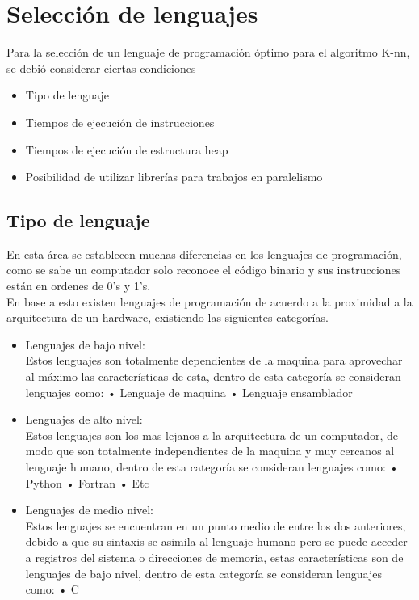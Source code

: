 \section{Selección de lenguajes}

Para la selección de un lenguaje de programación óptimo para el algoritmo K-nn, se debió considerar ciertas condiciones
\\
\begin{itemize}
\item Tipo de lenguaje
\item Tiempos de ejecución de instrucciones
\item Tiempos de ejecución de estructura heap
\item Posibilidad de utilizar librerías para trabajos en paralelismo
\end{itemize}  

\subsection*{Tipo de lenguaje}
En esta área se establecen muchas diferencias en los lenguajes de programación, como se sabe un computador solo reconoce el código binario y sus instrucciones están en ordenes de 0's y 1's. \\
En base a esto existen lenguajes de programación de acuerdo a la proximidad a la arquitectura de un hardware, existiendo las siguientes categorías.

\begin{itemize}
	\item Lenguajes de bajo nivel:\\
	Estos lenguajes son totalmente dependientes de la maquina para aprovechar al máximo las características de esta, dentro de esta categoría se consideran lenguajes como:
	\subitem •	 Lenguaje de maquina 
	\subitem •	 Lenguaje ensamblador 

	\item Lenguajes de alto nivel:\\
	Estos lenguajes son los mas lejanos a la arquitectura de un computador, de modo que son totalmente independientes de la maquina y muy cercanos al lenguaje humano, dentro de esta categoría se consideran lenguajes como:
	\subitem •	 Python
	\subitem •	 Fortran
	\subitem •	 Etc
	
	\item Lenguajes de medio nivel:\\
	Estos lenguajes se encuentran en un punto medio de entre los dos anteriores, debido a que su sintaxis se asimila al lenguaje humano pero se puede acceder a registros del sistema o direcciones de memoria, estas características son de lenguajes de bajo nivel, dentro de esta categoría se consideran lenguajes como:
	\subitem •	 C	
\end{itemize}  

